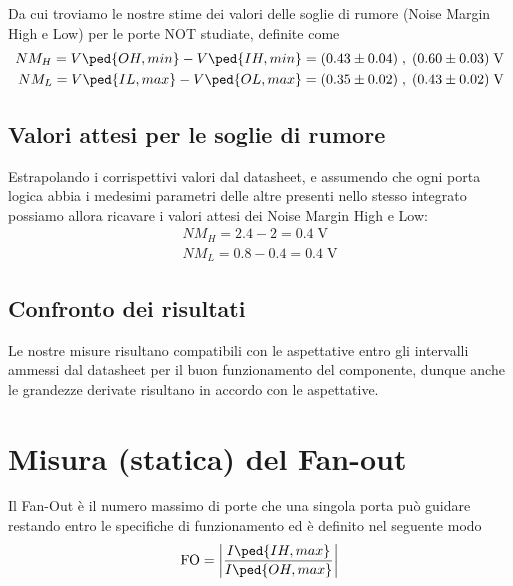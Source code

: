 \documentclass[10pt, a4paper, italian]{article}
\begin{document}
Da cui troviamo le nostre stime dei valori delle soglie di rumore (Noise
Margin High e Low) per le porte NOT studiate, definite come
\begin{align*}
    NM_H = V\ped{OH, min} - V\ped{IH, min} = (0.43 \pm 0.04) \; ,\;
    (0.60 \pm 0.03) \; \si{\V} \\
    NM_L = V\ped{IL, max} - V\ped{OL, max} = (0.35 \pm 0.02) \; ,\;
    (0.43 \pm 0.02) \; \si{\V}
\end{align*}

\subsection{Valori attesi per le soglie di rumore}
Estrapolando i corrispettivi valori dal datasheet, e assumendo che ogni porta
logica abbia i medesimi parametri delle altre presenti nello stesso integrato
possiamo allora ricavare i valori attesi dei Noise Margin High e Low:
\begin{align*}
NM_H = 2.4 - 2 = 0.4 \; \si{\V} \\
NM_L = 0.8 - 0.4 = 0.4 \; \si{\V}
\end{align*}

\subsection{Confronto dei risultati}
Le nostre misure risultano compatibili con le aspettative entro gli intervalli
ammessi dal datasheet per il buon funzionamento del componente, dunque anche
le grandezze derivate risultano in accordo con le aspettative.

\section{Misura (statica) del Fan-out}
Il Fan-Out è il numero massimo di porte che una singola porta può guidare
restando entro le specifiche di funzionamento ed è definito nel seguente modo
\[
\text{FO}= \abs{\frac{I\ped{IH, max}}{I\ped{OH, max}}}
\]
\end{document}
